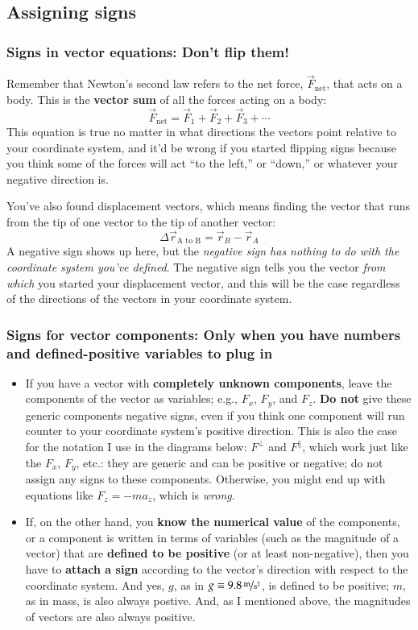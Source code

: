 \documentclass[10pt,letterpaper,twoside]{article}
\begin{document}
\subsection{Assigning signs}
\subsubsection{Signs in vector equations: Don't flip them!}
Remember that Newton's second law refers to the net force, $\vec F_{\text{net}}$, that acts on a body.
This is the \textbf{vector sum} of all the forces acting on a body:
$$ \vec F_{\text{net}} = \vec F_1 + \vec F_2 + \vec F_3 + \cdots $$
This equation is true no matter in what directions the vectors point relative to your coordinate system, and it'd be wrong if you started flipping signs because you think some of the forces will act ``to the left,'' or ``down,'' or whatever your negative direction is.

You've also found displacement vectors, which means finding the vector that runs from the tip of one vector to the tip of another vector:
$$ \Delta\vec r_{\text{A to B}} = \vec r_B - \vec r_A $$
A negative sign shows up here, but the \textit{negative sign has nothing to do with the coordinate system you've defined}.
The negative sign tells you the vector \textit{from which} you started your displacement vector, and this will be the case regardless of the directions of the vectors in your coordinate system.

\subsubsection{Signs for vector components: Only when you have numbers and defined-positive variables to plug in}
\begin{itemize}
  \item If you have a vector with \textbf{completely unknown components}, leave the components of the vector as variables; e.g., $F_x$, $F_y$, and $F_z$.
	\textbf{Do not} give these generic components negative signs, even if you think one component will run counter to your coordinate system's positive direction.
	This is also the case for the notation I use in the diagrams below: $F^{\perp}$ and $F^{\parallel}$, which work just like the $F_x$, $F_y$, etc.: they are generic and can be positive or negative; do not assign any signs to these components.
	Otherwise, you might end up with equations like $F_z=-ma_z$, which is \textit{wrong}.
  \item If, on the other hand, you \textbf{know the numerical value} of the components, or a component is written in terms of variables (such as the magnitude of a vector) that are \textbf{defined to be positive} (or at least non-negative), then you have to \textbf{attach a sign} according to the vector's direction with respect to the coordinate system.
	And yes, $g$, as in $g\equiv\unitfrac[9.8]{m}{s^{2}}$, is defined to be positive; $m$, as in mass, is also always postive. And, as I mentioned above, the magnitudes of vectors are also always positive.
\end{itemize}
\end{document}
